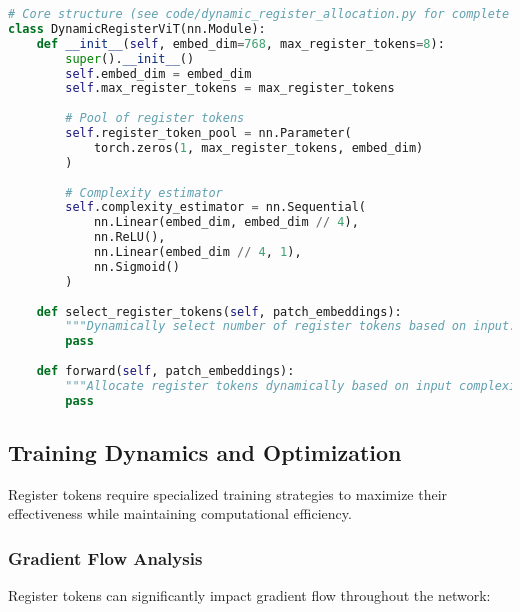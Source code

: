 \begin{lstlisting}[language=Python, caption=Dynamic register token allocation]
# Core structure (see code/dynamic_register_allocation.py for complete implementation)
class DynamicRegisterViT(nn.Module):
    def __init__(self, embed_dim=768, max_register_tokens=8):
        super().__init__()
        self.embed_dim = embed_dim
        self.max_register_tokens = max_register_tokens
        
        # Pool of register tokens
        self.register_token_pool = nn.Parameter(
            torch.zeros(1, max_register_tokens, embed_dim)
        )
        
        # Complexity estimator
        self.complexity_estimator = nn.Sequential(
            nn.Linear(embed_dim, embed_dim // 4),
            nn.ReLU(),
            nn.Linear(embed_dim // 4, 1),
            nn.Sigmoid()
        )
    
    def select_register_tokens(self, patch_embeddings):
        """Dynamically select number of register tokens based on input."""
        pass
    
    def forward(self, patch_embeddings):
        """Allocate register tokens dynamically based on input complexity"""
        pass
\end{lstlisting}

\subsection{Training Dynamics and Optimization}

Register tokens require specialized training strategies to maximize their effectiveness while maintaining computational efficiency.

\subsubsection{Gradient Flow Analysis}

Register tokens can significantly impact gradient flow throughout the network:


